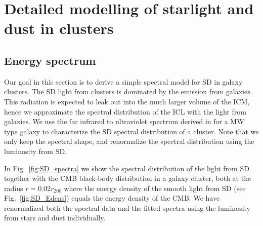 \documentclass[10pt,aps,pra,reprint,amsmath,amsfonts,amssymb,showpacs]{revtex4-1}
\newcommand{\rvir}{r_{200}}
\begin{document}
\vspace{-0.7cm}

%
%

\appendix

\section{Detailed modelling of  starlight and dust in clusters}


\subsection{Energy spectrum}

Our goal in this section is to derive a simple spectral model for SD
in galaxy clusters. The SD light from clusters is dominated by the
emission from galaxies. This radiation is expected to leak out into
the much larger volume of the ICM, hence we approximate the spectral
distribution of the ICL with the light from galaxies. We use the far
infrared to ultraviolet spectrum derived in \cite{2006ApJ...648L..29P}
for a MW type galaxy to characterize the SD spectral distribution of a
cluster. Note that we only keep the spectral shape, and renormalize
the spectral distribution using the luminosity from SD.

In Fig.~\ref{fig:SD_spectra} we show the spectral distribution of the
light from SD together with the CMB black-body distribution in a
galaxy cluster, both at the radius $r=0.02\rvir$ where the energy
density of the smooth light from SD (see Fig.~\ref{fig:SD_Edens})
equals the energy density of the CMB. We have renormalized both the
spectral data and the fitted spectra using the luminosity from stars
and dust individually.
\end{document}

